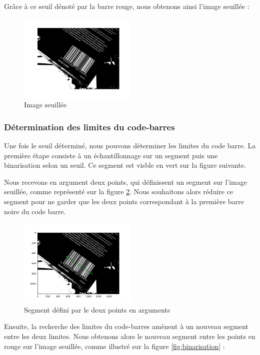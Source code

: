 \documentclass{rapport}
\begin{document}
Grâce à ce seuil dénoté par la barre rouge, nous obtenons ainsi l'image seuillée : 
\begin{figure}[H] 
	\centering
	\includegraphics[width=0.5\textwidth]{images/barcode_seuillee.png}
	\caption{Image seuillée}
	\label{img_seuillee}
\end{figure}

\subsubsection*{Détermination des limites du code-barres}
Une fois le seuil déterminé, nous pouvons déterminer les limites du code barre.
La première étape consiste à un échantillonnage sur un segment puis une binarisation selon un seuil. Ce segment est visble en vert sur la figure suivante.

Nous recevons en argument deux points, qui définissent un segment sur l'image seuillée, comme représenté sur la figure \ref{fig:segment}.
Nous souhaitons alors réduire ce segment pour ne garder que les deux points correspondant à la première barre noire du code barre.

\begin{figure}[H] 
	\centering
	\includegraphics[width=0.5\textwidth]{images/code_barre_couple_vert.png}
	\caption{Segment défini par le deux points en arguments}
	\label{fig:segment}
\end{figure}

Ensuite, la recherche des limites du code-barres amènent à un nouveau segment entre les deux limites. 
Nous obtenons alors le nouveau segment entre les points en rouge sur l'image seuillée, comme illustré sur la figure \ref{fig:binarisation} : 
\end{document}
